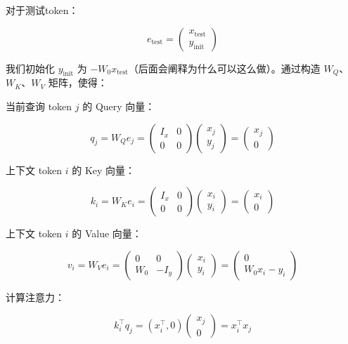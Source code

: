 对于测试token：

\[
e_{\mathrm{test}}=\begin{pmatrix}x_{\mathrm{test}}\\y_{\mathrm{init}}\end{pmatrix}
\]

我们初始化 \(y_{\mathrm{init}}\) 为 \(-W_0x_{\mathrm{test}}\)（后面会阐释为什么可以这么做）。通过构造 \(W_Q\)、\(W_K\)、\(W_V\) 矩阵，使得：

当前查询 token \(j\) 的 Query 向量：

\[
q_j=W_Q e_j=\begin{pmatrix}I_x&0\\0&0\end{pmatrix}\begin{pmatrix}x_j\\y_j\end{pmatrix}=\begin{pmatrix}x_j\\0\end{pmatrix}
\]

上下文 token \(i\) 的 Key 向量：

\[
k_i=W_K e_i=\begin{pmatrix}I_x&0\\0&0\end{pmatrix}\begin{pmatrix}x_i\\y_i\end{pmatrix}=\begin{pmatrix}x_i\\0\end{pmatrix}
\]

上下文 token \(i\) 的 Value 向量：

\[
v_i=W_V e_i=\begin{pmatrix}0&0\\W_0&-I_y\end{pmatrix}\begin{pmatrix}x_i\\y_i\end{pmatrix}=\begin{pmatrix}0\\W_0x_i-y_i\end{pmatrix}
\]

计算注意力：

\[
k_i^\top q_j=(x_i^\top,0)\begin{pmatrix}x_j\\0\end{pmatrix}=x_i^\top x_j
\]

